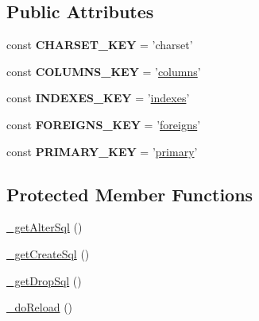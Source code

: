 \subsection*{Public Attributes}
\begin{DoxyCompactItemize}
\item 
\hypertarget{classZendDbSchema__Db__Schema__Table_a8b7b4a59eb28f358ab95992bf341db12}{const {\bfseries C\-H\-A\-R\-S\-E\-T\-\_\-\-K\-E\-Y} = 'charset'}\label{classZendDbSchema__Db__Schema__Table_a8b7b4a59eb28f358ab95992bf341db12}

\item 
\hypertarget{classZendDbSchema__Db__Schema__Table_ac13fb7223c36d4bbf60a49119a97ab40}{const {\bfseries C\-O\-L\-U\-M\-N\-S\-\_\-\-K\-E\-Y} = '\hyperlink{classZendDbSchema__Db__Schema__Table_a214354faa96de67a26b787c2c8741850}{columns}'}\label{classZendDbSchema__Db__Schema__Table_ac13fb7223c36d4bbf60a49119a97ab40}

\item 
\hypertarget{classZendDbSchema__Db__Schema__Table_a01298fd400be4ec1f395c99bb5f0e4b5}{const {\bfseries I\-N\-D\-E\-X\-E\-S\-\_\-\-K\-E\-Y} = '\hyperlink{classZendDbSchema__Db__Schema__Table_a47df29d95af8f655dd7506cfb649ec40}{indexes}'}\label{classZendDbSchema__Db__Schema__Table_a01298fd400be4ec1f395c99bb5f0e4b5}

\item 
\hypertarget{classZendDbSchema__Db__Schema__Table_a8f85f6841f1eb342a130544cc1d95c5f}{const {\bfseries F\-O\-R\-E\-I\-G\-N\-S\-\_\-\-K\-E\-Y} = '\hyperlink{classZendDbSchema__Db__Schema__Table_acff371c2884c9688b5ede2deaf09f25c}{foreigns}'}\label{classZendDbSchema__Db__Schema__Table_a8f85f6841f1eb342a130544cc1d95c5f}

\item 
\hypertarget{classZendDbSchema__Db__Schema__Table_a0a6dd33ec8d6288d94651b54269680b5}{const {\bfseries P\-R\-I\-M\-A\-R\-Y\-\_\-\-K\-E\-Y} = '\hyperlink{classZendDbSchema__Db__Schema__Table_a9d445dd6a92cc3a50aa6d8dad8395f0a}{primary}'}\label{classZendDbSchema__Db__Schema__Table_a0a6dd33ec8d6288d94651b54269680b5}

\end{DoxyCompactItemize}
\subsection*{Protected Member Functions}
\begin{DoxyCompactItemize}
\item 
\hyperlink{classZendDbSchema__Db__Schema__Table_a385e32fefac9fd4c6e4274c1e0c0b810}{\-\_\-get\-Alter\-Sql} ()
\item 
\hyperlink{classZendDbSchema__Db__Schema__Table_aefb813dece15a26017e580acc64e3406}{\-\_\-get\-Create\-Sql} ()
\item 
\hyperlink{classZendDbSchema__Db__Schema__Table_a7be2ac66a479e6264cc9b04980f65df6}{\-\_\-get\-Drop\-Sql} ()
\item 
\hyperlink{classZendDbSchema__Db__Schema__Table_abc05b1f219611fefdd0e9eaeff1761d9}{\-\_\-do\-Reload} ()
\end{DoxyCompactItemize}
